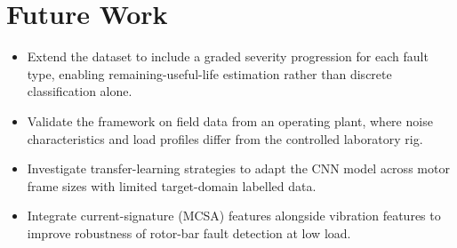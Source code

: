 \section{Future Work}
\begin{itemize}
  \item Extend the dataset to include a graded severity progression for each fault type, enabling
        remaining-useful-life estimation rather than discrete classification alone.
  \item Validate the framework on field data from an operating plant, where noise characteristics
        and load profiles differ from the controlled laboratory rig.
  \item Investigate transfer-learning strategies to adapt the CNN model across motor frame sizes
        with limited target-domain labelled data.
  \item Integrate current-signature (MCSA) features alongside vibration features to improve
        robustness of rotor-bar fault detection at low load.
\end{itemize}

